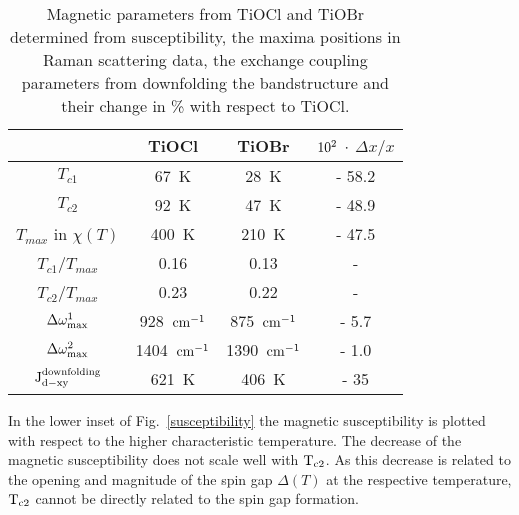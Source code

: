 \documentclass[prb,preprint,draft,amsmath,showpacs]{revtex4}
\begin{document}
\begin{table}[h!]
\caption{Magnetic parameters from TiOCl and TiOBr determined from susceptibility, the
maxima positions in Raman scattering data, the exchange coupling parameters from
downfolding the bandstructure and their change in \% with respect to TiOCl.}
\label{table2}\vspace{0.5cm} \centering
\begin{tabular}{|c|c|c|c|}
  \hline
                                   & TiOCl             & TiOBr               & $\rm 10^2$ $\cdot$ $\Delta x/x$\\ \hline\hline
                         $T_{c1}$  & 67~K              & 28~K                & - 58.2 \\ \hline
                         $T_{c2}$  & 92~K              & 47~K                & - 48.9 \\ \hline\hline
            $T_{max}$ in $\chi(T)$ & 400~K             & 210~K               & - 47.5 \\ \hline\hline
               $T_{c1}$/$T_{max}$  & 0.16              & 0.13                & -  \\ \hline
               $T_{c2}$/$T_{max}$  & 0.23              & 0.22                & -  \\ \hline\hline

  $\rm \Delta\omega_{max}^{1}$     & 928~$\rm cm^{-1}$ & 875~$\rm cm^{-1}$   & - 5.7  \\ \hline
  $\rm \Delta\omega_{max}^{2}$     &1404~$\rm cm^{-1}$ & 1390~$\rm cm^{-1}$  & - 1.0  \\
  \hline\hline
  $\rm J_{d-xy}^{downfolding}$       & 621~K             & 406~K               & - 35  \\ \hline
\end{tabular}
\end{table}


In the lower inset of Fig.~\ref{susceptibility} the magnetic susceptibility is plotted
with respect to the higher characteristic temperature. The decrease of the magnetic
susceptibility does not scale well with $\rm T_{c2}$. As this decrease is related to the
opening and magnitude of the spin gap $\Delta(T)$ at the respective temperature, $\rm
T_{c2}$ cannot be directly related to the spin gap formation.
\end{document}
